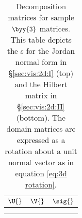 \clearpage
\thispagestyle{empty}
\begin{landscape}

\begin{table}[htdp]
\caption[Decomposition matrices for sample $\byy{3}$ matrices.]{Decomposition matrices for sample $\byy{3}$ matrices. This table depicts the \asvd s for the Jordan normal form in \S \eqref{sec:vis:2d:I} (top) and the Hilbert matrix in \S \eqref{sec:vis:2d:II} (bottom). The domain matrices are expressed as a rotation about a unit normal vector as in equation \eqref{eq:3d rotation}.}
\begin{center}
\begin{tabular}{ccc}
%
  $\U{}$ & \quad $\V{}$ & \quad $\sig{}$ \\[0pt]\hline
%
	\includegraphics[ width = 1.85in ] {images/bases/"jcf U 4 circles"} & \quad
	\includegraphics[ width = 1.85in ] {images/bases/"jcf V 4 circles"} & \quad
	\includegraphics[ width = 2.30in ] {images/bases/"jcf ellipsoid".png} \\[0pt]
%
	\includegraphics[ width = 1.85in ] {images/bases/"hilbert 4 circles"} & \quad
	\includegraphics[ width = 1.85in ] {images/bases/"hilbert 4 circles"} & \quad
	\includegraphics[ width = 2.10in ] {images/bases/"hilbert ellipsoid"} 
%
\end{tabular}
\end{center}
\label{tab:coin:a}
\end{table}

\end{landscape}

\endinput